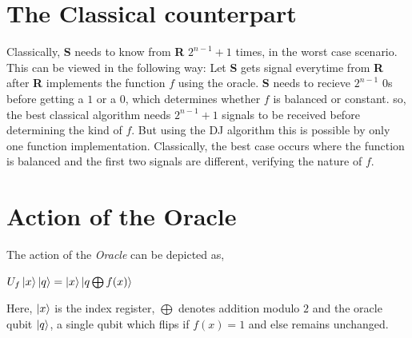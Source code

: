 \documentclass{article}
\begin{document}
\section{The Classical counterpart}
Classically, \textbf{S} needs to know from \textbf{R} $2^{n-1} + 1$ times, in the worst case scenario. This can be viewed in the following way: Let \textbf{S} gets signal everytime from \textbf{R} after \textbf{R} implements the function $f$ using the oracle. \textbf{S} needs to recieve $2^{n-1}$ $0$s before getting a $1$ or a $0$, which determines whether $f$ is balanced or constant. so, the best classical algorithm needs $2^{n-1} + 1$ signals to be received before determining the kind of $f$. But using the DJ algorithm this is possible by only one function implementation. Classically, the best case occurs where the function is balanced and the first two signals are different, verifying the nature of $f$.

\section{Action of the Oracle}
The action of the \textit{Oracle} can be depicted as, 
\begin{center}
$U_f \ket{x} \ket{q} = \ket{x} \ket{q \bigoplus f(x)}$
\end{center}
Here, $\ket{x}$ is the index register, $\bigoplus$ denotes addition modulo $2$ and the oracle qubit $\ket{q}$, a single qubit which flips if $f(x)=1$ and else remains unchanged. 
\end{document}
